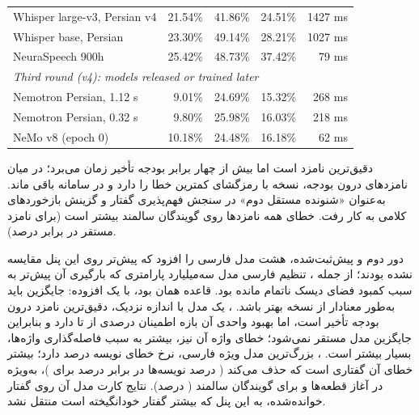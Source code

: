\begin{table}[ht]
\begin{latin}
\begin{tabular}{lrrrr}
Whisper large-v3, Persian v4 & 21.54\% & 41.86\% & 24.51\% & 1427 ms \\
Whisper base, Persian & 23.30\% & 49.14\% & 28.21\% & 1027 ms \\
NeuraSpeech 900h & 25.42\% & 48.73\% & 37.42\% & 79 ms \\
\midrule
\multicolumn{5}{l}{\emph{Third round (v4): models released or trained later}} \\
Nemotron Persian, 1.12 s & 9.01\% & 24.69\% & 15.32\% & 268 ms \\
Nemotron Persian, 0.32 s & 9.80\% & 25.98\% & 16.03\% & 218 ms \\
NeMo v8 (epoch 0) & 10.18\% & 24.48\% & 16.18\% & 62 ms \\
\bottomrule
\end{tabular}
\end{latin}
\end{table}

 دقیق‌ترین نامزد است اما بیش از چهار برابر بودجه تأخیر زمان می‌برد؛ در میان
نامزدهای درون بودجه،  نسخه  با رمزگشای  کمترین خطا را
دارد و در سامانه باقی ماند.  به‌عنوان «شنونده مستقل دوم» در
سنجش فهم‌پذیری گفتار و گزینش بازخوردهای کلامی به کار رفت. خطای همه نامزدها
روی گویندگان سالمند بیشتر است (برای نامزد مستقر  در برابر 
درصد).

دور دوم و پیش‌ثبت‌شده، هشت مدل فارسی را افزود که پیش‌تر روی این پنل مقایسه نشده
بودند؛ از جمله ، تنظیم فارسی مدل سه‌میلیارد پارامتری
 که بارگیری آن پیش‌تر به سبب کمبود فضای دیسک ناتمام مانده بود. قاعده
همان بود، با یک افزوده: جایگزین باید به‌طور معنادار از  نسخه  بهتر
باشد. ، یک مدل  با اندازه نزدیک، دقیق‌ترین نامزد درون
بودجه تأخیر است، اما بهبود  واحدی آن بازه اطمینان  درصدی از
 تا  دارد و بنابراین جایگزین مدل مستقر نمی‌شود؛ خطای واژه آن نیز،
بیشتر به سبب فاصله‌گذاری واژه‌ها، بسیار بیشتر است. ، بزرگ‌ترین مدل ویژه
فارسی، نرخ خطای نویسه  درصد دارد؛ بیشتر خطای آن گفتاری است که حذف می‌کند
( درصد نویسه‌ها در برابر  درصد برای )، به‌ویژه در آغاز
قطعه‌ها و برای گویندگان سالمند ( درصد). نتایج کارت مدل آن روی گفتار
خوانده‌شده، به این پنل که بیشتر گفتار خودانگیخته است منتقل نشد.


